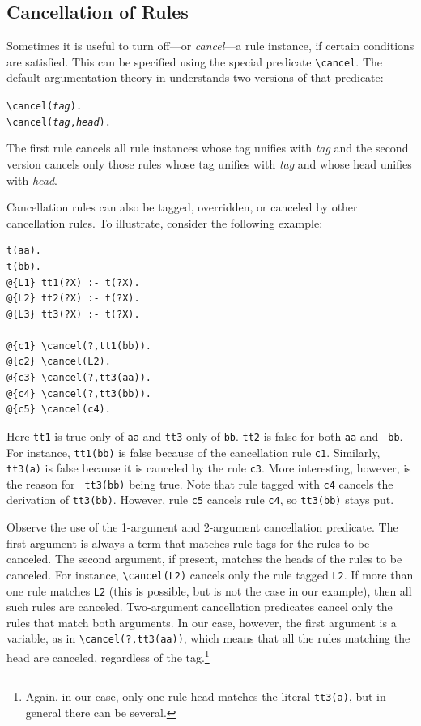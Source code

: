 \documentclass[11pt]{article}
\newcommand{\ERGO}{\mbox{\smaller{\ensuremath{\cal{E}}\smaller{{\sc{RGO}}}}}\xspace}
\newcommand{\FLSYSTEM}{\ERGO}
\newcommand{\bs}{\textbackslash}
\begin{document}
\subsection{Cancellation of Rules}\label{sec-cancel}

Sometimes it is useful to turn off---or \emph{cancel}---a rule instance, if
certain conditions are satisfied. This can be specified using the special
predicate {\tt \bs{}cancel}. The default argumentation theory in \FLSYSTEM  
understands two versions of that predicate:
\begin{alltt}
    \bs{}cancel(\textnormal{\textit{tag}}).
    \bs{}cancel(\textnormal{\textit{tag}},\textnormal{\textit{head}}).
\end{alltt}
The first rule cancels all rule instances whose tag unifies with
\emph{tag} and the second version cancels only those rules whose tag
unifies with \emph{tag} and whose head unifies with \emph{head}.   

Cancellation rules can also be tagged, overridden,
or canceled by other cancellation
rules. To illustrate,  consider the following example:
\begin{verbatim}
t(aa).
t(bb).
@{L1} tt1(?X) :- t(?X).
@{L2} tt2(?X) :- t(?X).
@{L3} tt3(?X) :- t(?X).

@{c1} \cancel(?,tt1(bb)).
@{c2} \cancel(L2).
@{c3} \cancel(?,tt3(aa)).
@{c4} \cancel(?,tt3(bb)).
@{c5} \cancel(c4).
\end{verbatim}
Here {\tt tt1} is true only of {\tt aa} and  
{\tt tt3} only of {\tt bb}. {\tt tt2} is false for both {\tt aa} and {\tt
  bb}. For instance, {\tt tt1(bb)} is false because of the cancellation
rule {\tt c1}. Similarly, {\tt tt3(a)} is false because it is canceled by
the rule {\tt c3}.   More interesting, however, is the reason for {\tt
  tt3(bb)} being true. Note that rule tagged with {\tt c4} cancels the
derivation of {\tt tt3(bb)}. However, rule {\tt c5} cancels rule {\tt c4},
so {\tt tt3(bb)} stays put.

Observe the use of the 1-argument and 2-argument cancellation predicate.
The first argument is always a term that matches rule tags for the rules
to be canceled. The second
argument, if present, matches the heads of the rules to be canceled. For
instance, {\tt \bs{}cancel(L2)} cancels only the rule tagged {\tt L2}. If more
than one rule matches {\tt L2} (this is possible, but is not the case in
our example), then all such rules are canceled. Two-argument cancellation
predicates cancel only the rules that match both arguments. In our case,
however, the first argument is a variable, as in {\tt \bs{}cancel(?,tt3(aa))},
which means that all the rules matching the head are canceled, regardless
of the tag.\footnote{
  Again, in our case, only one rule head matches the literal {\tt tt3(a)},
  but in general there can be several.
}
\end{document}
